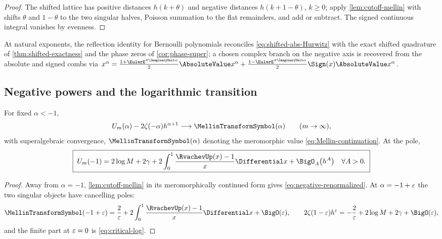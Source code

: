 \begin{proof}
The shifted lattice has positive distances $h(k+\theta)$ and negative
distances $h(k+1-\theta)$, $k\ge0$; apply \cref{lem:cutoff-mellin}
with shifts $\theta$ and $1-\theta$ to the two singular halves,
Poisson summation to the flat remainders, and add or subtract.  The
signed continuous integral vanishes by evenness.
\end{proof}

At natural exponents, the reflection identity for Bernoulli
polynomials reconciles \eqref{eq:shifted-abs-Hurwitz} with the exact
shifted quadrature of \cref{thm:shifted-exactness} and the phase
zeros of \cref{cor:phase-super}; a chosen complex branch on the
negative axis is recovered from the absolute and signed combs via
$x^{\alpha}
=\tfrac{1+\EulerE^{\pi\ImaginaryUnit\alpha}}2\AbsoluteValue x^{\alpha}
+\tfrac{1-\EulerE^{\pi\ImaginaryUnit\alpha}}2\Sign(x)\AbsoluteValue x^{\alpha}$.

\subsection{Negative powers and the logarithmic transition}

\begin{proposition}
\label{prop:negative-powers}
For fixed $\alpha<-1$,
\begin{equation}
 U_m(\alpha)-2\zeta(-\alpha)h^{\alpha+1}
 \longrightarrow \MellinTransformSymbol(\alpha)
 \qquad(m\to\infty),
 \label{eq:negative-renormalized}
\end{equation}
with superalgebraic convergence, $\MellinTransformSymbol(\alpha)$ denoting the
meromorphic value \eqref{eq:Mellin-continuation}.  At the pole,
\begin{equation}
 \boxed{\;
 U_m(-1)
 =2\log M+2\gamma
 +2\int_0^1\frac{\RvachevUp(x)-1}{x}\Differential x
 +\BigO_A\bigl(h^{A}\bigr)
 \quad\forall A>0.
 \;}
 \label{eq:critical-log}
\end{equation}
\end{proposition}

\begin{proof}
Away from $\alpha=-1$, \cref{lem:cutoff-mellin} in its meromorphically
continued form gives \eqref{eq:negative-renormalized}.  At
$\alpha=-1+\varepsilon$ the two singular objects have cancelling poles:
\[
 \MellinTransformSymbol(-1+\eps)=\frac2\eps
 +2\int_0^1\frac{\RvachevUp(x)-1}{x}\Differential x+\BigO(\eps),
 \qquad
 2\zeta(1-\eps)h^{\eps}
 =-\frac2\eps+2\log M+2\gamma+\BigO(\eps),
\]
and the finite part at $\varepsilon=0$ is \eqref{eq:critical-log}.
\end{proof}

